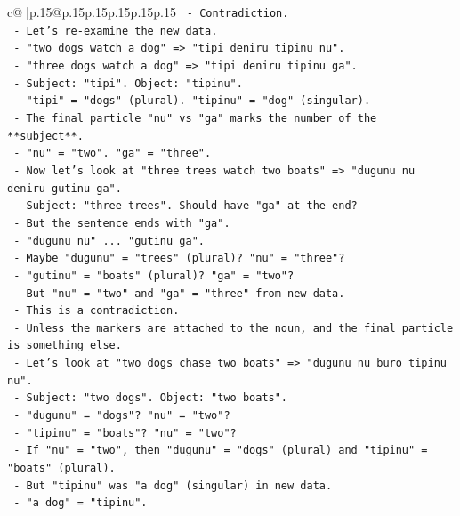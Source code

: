 \documentclass{article}
\begin{document}
{\begin{supertabular}{c@{$\;$}|p{.15\linewidth}@{}p{.15\linewidth}p{.15\linewidth}p{.15\linewidth}p{.15\linewidth}p{.15\linewidth}}
{{{\texttt{         {-} Contradiction.} \\
\texttt{       {-} Let's re{-}examine the new data.} \\
\texttt{       {-} "two dogs watch a dog" => "tipi deniru tipinu nu".} \\
\texttt{       {-} "three dogs watch a dog" => "tipi deniru tipinu ga".} \\
\texttt{       {-} Subject: "tipi". Object: "tipinu".} \\
\texttt{       {-} "tipi" = "dogs" (plural). "tipinu" = "dog" (singular).} \\
\texttt{       {-} The final particle "nu" vs "ga" marks the number of the **subject**.} \\
\texttt{       {-} "nu" = "two". "ga" = "three".} \\
\texttt{       {-} Now let's look at "three trees watch two boats" => "dugunu nu deniru gutinu ga".} \\
\texttt{         {-} Subject: "three trees". Should have "ga" at the end?} \\
\texttt{         {-} But the sentence ends with "ga".} \\
\texttt{         {-} "dugunu nu" ... "gutinu ga".} \\
\texttt{         {-} Maybe "dugunu" = "trees" (plural)? "nu" = "three"?} \\
\texttt{         {-} "gutinu" = "boats" (plural)? "ga" = "two"?} \\
\texttt{         {-} But "nu" = "two" and "ga" = "three" from new data.} \\
\texttt{         {-} This is a contradiction.} \\
\texttt{       {-} Unless the markers are attached to the noun, and the final particle is something else.} \\
\texttt{       {-} Let's look at "two dogs chase two boats" => "dugunu nu buro tipinu nu".} \\
\texttt{         {-} Subject: "two dogs". Object: "two boats".} \\
\texttt{         {-} "dugunu" = "dogs"? "nu" = "two"?} \\
\texttt{         {-} "tipinu" = "boats"? "nu" = "two"?} \\
\texttt{         {-} If "nu" = "two", then "dugunu" = "dogs" (plural) and "tipinu" = "boats" (plural).} \\
\texttt{         {-} But "tipinu" was "a dog" (singular) in new data.} \\
\texttt{         {-} "a dog" = "tipinu".} \\
}}}
\end{supertabular}}
\end{document}
